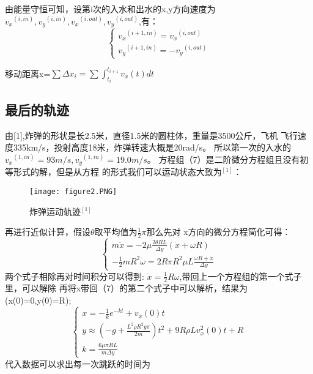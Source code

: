 \documentclass[UTF8]{ctexart}
\begin{document}
由能量守恒可知，设第i次的入水和出水的x,y方向速度为${v_x}^{(i,in)},{v_y}^{(i,in)},{v_x}^{(i,out)},{v_y}^{(i,out)}$,有：
\begin{equation}
  \begin{cases}
    {v_x}^{(i+1,in)}={v_x}^{(i,out)}\\
    {v_y}^{(i+1,in)}=-{v_y}^{(i,out)}
  \end{cases}
\end{equation}

  移动距离x=$\sum{\Delta{x_i}}=\sum{\int_{t_i}^{t_{i+1}}{{v_x(t)dt}}}$


   \subsection{最后的轨迹}
   由[1],炸弹的形状是长2.5米，直径1.5米的圆柱体，重量是3500公斤，飞机
   飞行速度335km/s，投射高度18米，炸弹转速大概是20rad/s。
   所以第一次的入水的${v_x}^{(1,in)}=93m/s,{v_y}^{(1,in)}=19.0m/s$。
    \indent 方程组（7）是二阶微分方程组且没有初等形式的解，但是从方程
    的形式我们可以运动状态大致为$^{[1]}$：
    \begin{figure}
      \centering
      \texttt{[image: figure2.PNG]}
      \caption{炸弹运动轨迹$^{[1]}$}
    \end{figure}

    \indent  再进行近似计算，假设$\theta$取平均值为$\frac{1}{2}\pi$那么先对
    x方向的微分方程简化可得：
    \begin{equation}
      \begin{cases}
           m\ddot{x}=-2\mu\frac{2\theta{RL}}{\Delta{y}}({\dot{x}+\omega{R}})\\
           -\frac{1}{2}mR^2\dot{\omega}=2R\pi{R^2}\mu{L}{\frac{\omega{R}+\dot{x}}{\Delta{y}}}
      \end{cases}
    \end{equation} 
两个式子相除再对时间积分可以得到:  $\dot{x}=\frac{1}{2}R\omega$,带回上一个方程组的第一个式子里，可以解除
再将x带回（7）的第二个式子中可以解析，结果为(x(0)=0,y(0)=R);
\begin{equation}
  \begin{cases}
      x=-\frac{1}{k}e^{-kt}+v_x(0)t\\
      y\approx(-g+\frac{L^2\rho{R^2}g\pi}{2m})t^2+9R\rho{L}v_x^2(0)t+R\\
      k={\frac{6\mu{\pi}RL}{m\Delta{y}}}
  \end{cases}
\end{equation}
代入数据可以求出每一次跳跃的时间为
\end{document}
